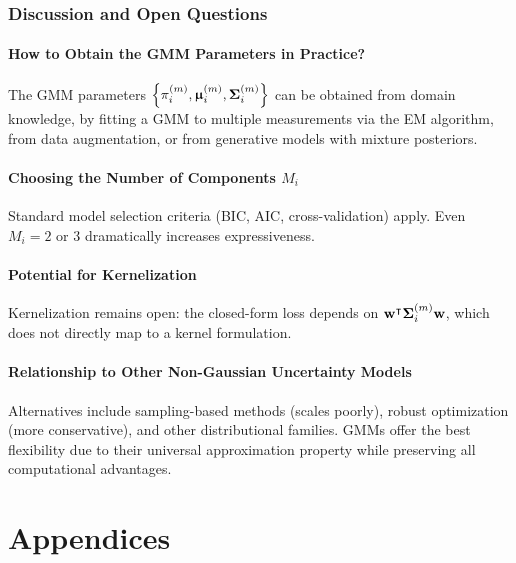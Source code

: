 \documentclass[11pt, letterpaper]{article}
\newcommand{\bSigma}{\vb{\Sigma}}
\newcommand{\bmu}{\boldsymbol{\upmu}}
\begin{document}
\section{Discussion and Open Questions}\label{sec:discussion}

\subsection{How to Obtain the GMM Parameters in Practice?}

The GMM parameters $\left\{\pi_i^{(m)}, \bmu_i^{(m)}, \bSigma_i^{(m)}\right\}$ can be obtained from domain knowledge, by fitting a GMM to multiple measurements via the EM algorithm, from data augmentation, or from generative models with mixture posteriors.

\subsection{Choosing the Number of Components $M_i$}

Standard model selection criteria (BIC, AIC, cross-validation) apply. Even $M_i = 2$ or $3$ dramatically increases expressiveness.

\subsection{Potential for Kernelization}

Kernelization remains open: the closed-form loss depends on $\vb{w}^{\intercal} \bSigma_i^{(m)} \vb{w}$, which does not directly map to a kernel formulation.

\subsection{Relationship to Other Non-Gaussian Uncertainty Models}

Alternatives include sampling-based methods (scales poorly), robust optimization (more conservative), and other distributional families. GMMs offer the best flexibility due to their universal approximation property while preserving all computational advantages.

\appendix

\part*{Appendices}
\end{document}
